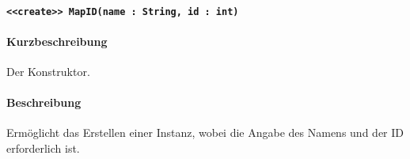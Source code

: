 \paragraph*{\texttt{<<create>> MapID(name : String, id : int)}}%
\paragraph*{Kurzbeschreibung}
Der Konstruktor.
\paragraph*{Beschreibung}
Ermöglicht das Erstellen einer Instanz, wobei die Angabe des Namens und der ID erforderlich ist.
